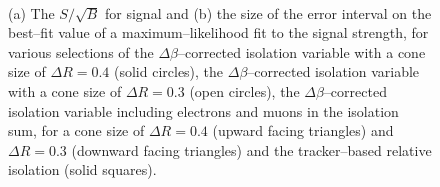 \begin{figure}[h!]
\begin{center}
~\\
\end{center}
\caption[The $S/\sqrt{B}$ for \Ztautau signal and
the size of the error interval on the best--fit value of a
maximum--likelihood fit to the \Ztautau signal strength, for various 
isolation selections.]{(a) The $S/\sqrt{B}$ for \Ztautau signal and (b) the size of the error interval on 
the best--fit value of a maximum--likelihood fit to the \Ztautau signal strength,
for various selections of the $\Delta\beta$--corrected
isolation variable with a cone size of $\Delta R = 0.4$ (solid circles), 
the $\Delta\beta$--corrected isolation variable with a cone size of $\Delta R = 0.3$ (open circles),
the $\Delta\beta$--corrected isolation variable including electrons and muons in the isolation
sum, for a cone size of $\Delta R =0.4$ (upward facing triangles) and $\Delta R =0.3$ (downward facing triangles) and
the tracker--based relative isolation (solid squares).}
\label{fig:mssm_selection_mt_muons}
\end{figure}

